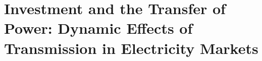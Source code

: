 
\graphicspath{{../JMP/}{../JMP/images/}}

\chapter{Investment and the Transfer of Power: Dynamic Effects of Transmission in Electricity Markets}
\label{ch:jmp}

\begingroup

\renewcommand{\maketitle}{}%
\renewcommand{\title}[1]{}%
\renewcommand{\author}[1]{}%
\renewcommand{\date}[1]{}%

\renewenvironment{titlepage}{}{}
\let\origsetcounter\setcounter
\renewcommand{\setcounter}[2]{}%
\let\origthispagestyle\thispagestyle
\renewcommand{\thispagestyle}[1]{}%

\renewcommand{\printbibliography}{}

\renewcommand{\appendix}{}%

\let\origsinglespacing\singlespacing
\renewcommand{\singlespacing}{}%
\let\origonehalfspacing\onehalfspacing
\renewcommand{\onehalfspacing}{}%



\RestoreTitlePage
\let\setcounter\origsetcounter
\let\thispagestyle\origthispagestyle
\let\singlespacing\origsinglespacing
\let\onehalfspacing\origonehalfspacing

\endgroup

\singlespacing

{}

\doublespacing
